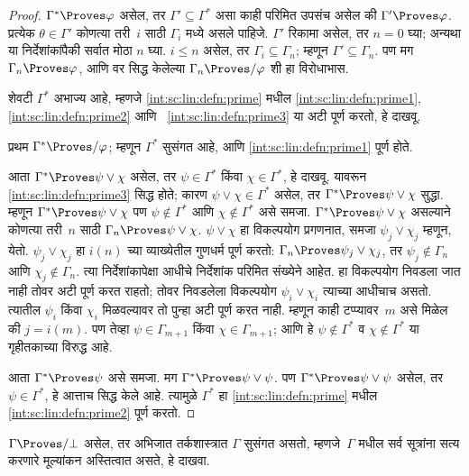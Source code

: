 \begin{proof}
  $\Gamma^* \Proves \varphi$ असेल, तर
  $\Gamma' \subseteq \Gamma^*$
  असा काही परिमित उपसंच असेल की
  $\Gamma' \Proves \varphi$.
  प्रत्येक $\theta \in \Gamma'$ कोणत्या
  तरी~$i$ साठी $\Gamma_i$ मध्ये असले
  पाहिजे. $\Gamma'$ रिकामा असेल, तर $n=0$ घ्या;
  अन्यथा या निर्देशांकांपैकी सर्वात मोठा $n$ घ्या. $i \le n$ असेल, तर
  $\Gamma_i \subseteq \Gamma_n$;
  म्हणून $\Gamma' \subseteq \Gamma_n$.
  पण मग $\Gamma_n \Proves \varphi$,
  आणि वर सिद्ध केलेल्या
  $\Gamma_n \Proves/ \varphi$ शी हा विरोधाभास.

  शेवटी $\Gamma^*$ अभाज्य आहे,
  म्हणजे \ref{int:sc:lin:defn:prime} मधील
  \ref{int:sc:lin:defn:prime1},
  \ref{int:sc:lin:defn:prime2} आणि~
  \ref{int:sc:lin:defn:prime3} या अटी
  पूर्ण करतो, हे दाखवू.

  प्रथम $\Gamma^* \Proves/ \varphi$;
  म्हणून $\Gamma^*$ सुसंगत आहे,
  आणि \ref{int:sc:lin:defn:prime1} पूर्ण होते.

  आता $\Gamma^* \Proves \psi \lor \chi$
  असेल, तर $\psi \in \Gamma^*$
  किंवा $\chi \in \Gamma^*$,
  हे दाखवू. यावरून
  \ref{int:sc:lin:defn:prime3} सिद्ध होते;
  कारण $\psi \lor \chi \in \Gamma^*$
  असेल, तर $\Gamma^* \Proves \psi
  \lor \chi$ सुद्धा. म्हणून
  $\Gamma^* \Proves \psi \lor \chi$
  पण $\psi \notin \Gamma^*$
  आणि $\chi \notin \Gamma^*$
  असे समजा.
  $\Gamma^* \Proves \psi \lor \chi$
  असल्याने कोणत्या तरी~$n$ साठी
  $\Gamma_n \Proves \psi \lor \chi$.
  $\psi \lor \chi$ हा विकल्पयोग
  प्रगणनात, समजा $\psi_j \lor \chi_j$
  म्हणून, येतो.
  $\psi_j \lor \chi_j$ हा
  $i(n)$ च्या व्याख्येतील गुणधर्म
  पूर्ण करतो: $\Gamma_n \Proves \psi_j
  \lor \chi_j$, तर
  $\psi_j \notin \Gamma_n$ आणि
  $\chi_j \notin \Gamma_n$.
  त्या निर्देशांकापेक्षा आधीचे निर्देशांक
  परिमित संख्येने आहेत. हा विकल्पयोग
  निवडला जात नाही तोवर अटी पूर्ण करत
  राहतो; तोवर निवडलेला विकल्पयोग
  $\psi_i \lor \chi_i$ त्याच्या आधीचाच असतो.
  त्यातील $\psi_i$ किंवा $\chi_i$
  मिळवल्यावर तो पुन्हा अटी पूर्ण करत नाही.
  म्हणून काही टप्प्यावर~$m$
  असे मिळेल की $j = i(m)$.
  पण तेव्हा $\psi \in \Gamma_{m+1}$
  किंवा $\chi \in \Gamma_{m+1}$;
  आणि हे $\psi \notin \Gamma^*$
  व $\chi \notin \Gamma^*$ या
  गृहीतकाच्या विरुद्ध आहे.

  आता $\Gamma^* \Proves \psi$
  असे समजा. मग
  $\Gamma^* \Proves \psi \lor \psi$.
  पण $\Gamma^* \Proves \psi \lor \psi$
  असेल, तर $\psi \in \Gamma^*$,
  हे आत्ताच सिद्ध केले आहे.
  त्यामुळे $\Gamma^*$ हा
  \ref{int:sc:lin:defn:prime} मधील
  \ref{int:sc:lin:defn:prime2} पूर्ण करतो.
\end{proof}

\begin{prob}
$\Gamma \Proves/ \bot$ असेल, तर
अभिजात तर्कशास्त्रात $\Gamma$ सुसंगत
असतो, म्हणजे~$\Gamma$ मधील सर्व सूत्रांना
सत्य करणारे मूल्यांकन अस्तित्वात असते,
हे दाखवा.
\end{prob}






